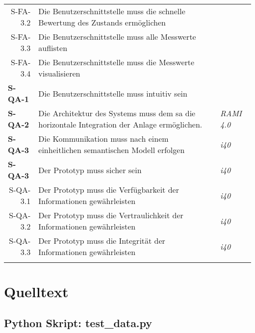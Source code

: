 \begin{tabularx}{\textwidth}{@{}lXp{2cm}@{}}
      \multicolumn{1}{r}{S-FA-3.2} &  Die Benutzerschnittstelle muss die schnelle Bewertung des Zustands ermöglichen \\
      \multicolumn{1}{r}{S-FA-3.3} &  Die Benutzerschnittstelle muss alle Messwerte auflisten \\
      \multicolumn{1}{r}{S-FA-3.4} &  Die Benutzerschnittstelle muss die Messwerte visualisieren \\
      \textbf{S-QA-1}              & Die Benutzerschnittstelle muss intuitiv sein   \\
      \textbf{S-QA-2}              & Die Architektur des Systems muss dem \ac{sa} die horizontale Integration der Anlage ermöglichen.   & \textit{RAMI 4.0} \\
      \textbf{S-QA-3}              &  Die Kommunikation muss nach einem einheitlichen semantischen Modell erfolgen  & \textit{\ac{i40}} \\
      \textbf{S-QA-3}              &  Der Prototyp muss sicher sein  & \textit{\ac{i40}} \\
      \multicolumn{1}{r}{S-QA-3.1}              &  Der Prototyp muss die Verfügbarkeit der Informationen gewährleisten  & \textit{\ac{i40}} \\
      \multicolumn{1}{r}{S-QA-3.2}              &  Der Prototyp muss die Vertraulichkeit der Informationen gewährleisten  & \textit{\ac{i40}} \\
      \multicolumn{1}{r}{S-QA-3.3}              &  Der Prototyp muss die Integrität der Informationen gewährleisten & \textit{\ac{i40}} \\
      \addlinespace
      \bottomrule
      \caption{Anforderungen aus Systemebene}
      \label{system_anforderungen}
  \end{tabularx}

\section{Quelltext}

\subsection{Python Skript: test\_data.py}

